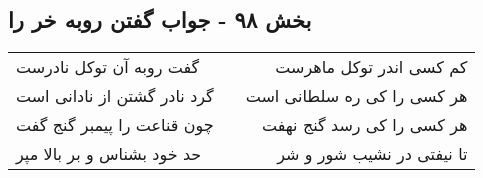 \begin{center}
\section*{بخش ۹۸ - جواب گفتن روبه خر را}
\label{sec:sh098}
\begin{longtable}{l p{0.5cm} r}
گفت روبه آن توکل نادرست
&&
کم کسی اندر توکل ماهرست
\\
گرد نادر گشتن از نادانی است
&&
هر کسی را کی ره سلطانی است
\\
چون قناعت را پیمبر گنج گفت
&&
هر کسی را کی رسد گنج نهفت
\\
حد خود بشناس و بر بالا مپر
&&
تا نیفتی در نشیب شور و شر
\\
\end{longtable}
\end{center}

